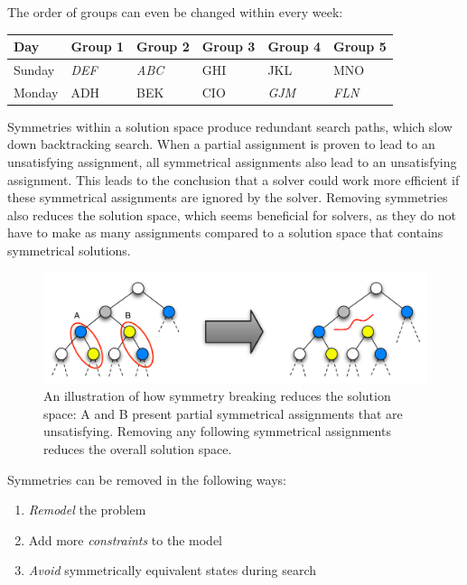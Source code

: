 \documentclass[a4paper]{scrartcl}
\begin{document}
The order of groups can even be changed within every week:

\begin{table}[h]
\centering
\begin{tabular}{ l | l  l  l l  l }
Day & Group 1 & Group 2 & Group 3 & Group 4 & Group 5 \\
\hline
Sunday & \emph{DEF} & \emph{ABC} & GHI & JKL & MNO \\
Monday & ADH  & BEK & CIO & \emph{GJM} & \emph{FLN}\\
\end{tabular}
\end{table}

Symmetries within a solution space produce redundant search paths, which slow down backtracking search. When a partial assignment is proven to lead to an unsatisfying assignment, all symmetrical assignments also lead to an unsatisfying assignment. This leads to the conclusion that a solver could work more efficient if these symmetrical assignments are ignored by the solver. Removing symmetries also reduces the solution space, which seems beneficial for solvers, as they do not have to make as many assignments compared to a solution space that contains symmetrical solutions.

\begin{figure}[h!]
\centering
    \includegraphics[width=13.6cm]{images/symmetry_breaking}
    \caption{An illustration of how symmetry breaking reduces the solution space: A and B present partial symmetrical assignments that are unsatisfying. Removing any following symmetrical assignments reduces the overall solution space.}
\end{figure}

Symmetries can be removed in the following ways:

\begin{mdframed}[skipabove=\baselineskip, skipbelow=\baselineskip, leftmargin=20, rightmargin=20]

\begin{enumerate}
\item \emph{Remodel} the problem
\item Add more \emph{constraints} to the model
\item \emph{Avoid} symmetrically equivalent states during search
\end{enumerate}

\end{mdframed}
\end{document}
